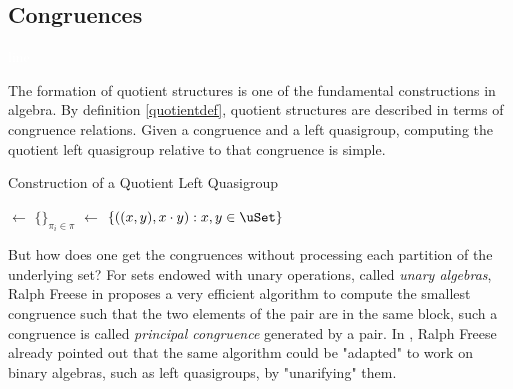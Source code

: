 \newpage



\subsection{Congruences}\textcolor{white}{line}


\noindent The formation of quotient structures is one of the fundamental constructions in algebra. By definition \ref{quotientdef}, quotient structures are described in terms of congruence relations.
\noindent Given a congruence and a left quasigroup, computing the quotient left quasigroup relative to that congruence is simple. \newline\newline
\begin{algorithm}[H]

\DontPrintSemicolon
{}
\caption{Construction of a Quotient Left Quasigroup}


\BlankLine
\BlankLine
\uSet $\leftarrow$ $\{$$\}_{\pi_i \in \pi }$\;
\Graph $\leftarrow$ $\{((x,y), x\cdot y) : x,y \in \uSet\}$\;
\end{algorithm}\vspace{0.9em}
 \noindent But how does one get the congruences without processing each partition of the underlying set? For sets endowed with unary operations, called \emph{unary algebras}, Ralph Freese in \cite{freese2008computing} proposes a very efficient algorithm to compute the smallest congruence such that the two elements of the pair are in the same block, such a congruence is called \emph{principal congruence} generated by a pair. In \cite{freese2008computing}, Ralph Freese already pointed out that the same algorithm could be "adapted" to work on binary algebras, such as left quasigroups, by "unarifying" them. \newline
 

